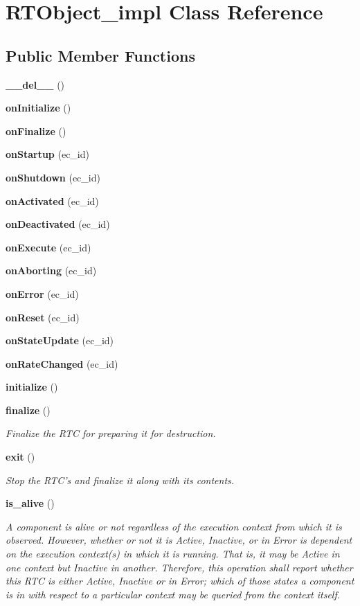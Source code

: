 \section{RTObject\_\-impl Class Reference}
\label{classRTObject__impl}
\subsection*{Public Member Functions}
\begin{CompactItemize}
\item 
{\bf \_\-\_\-del\_\-\_\-} ()
\item 
{\bf on\-Initialize} ()
\item 
{\bf on\-Finalize} ()
\item 
{\bf on\-Startup} (ec\_\-id)
\item 
{\bf on\-Shutdown} (ec\_\-id)
\item 
{\bf on\-Activated} (ec\_\-id)
\item 
{\bf on\-Deactivated} (ec\_\-id)
\item 
{\bf on\-Execute} (ec\_\-id)
\item 
{\bf on\-Aborting} (ec\_\-id)
\item 
{\bf on\-Error} (ec\_\-id)
\item 
{\bf on\-Reset} (ec\_\-id)
\item 
{\bf on\-State\-Update} (ec\_\-id)
\item 
{\bf on\-Rate\-Changed} (ec\_\-id)
\item 
{\bf initialize} ()
\item 
{\bf finalize} ()
\begin{CompactList}\small\item\em Finalize the RTC for preparing it for destruction. \item\end{CompactList}\item 
{\bf exit} ()
\begin{CompactList}\small\item\em Stop the RTC's and finalize it along with its contents. \item\end{CompactList}\item 
{\bf is\_\-alive} ()
\begin{CompactList}\small\item\em A component is alive or not regardless of the execution context from which it is observed. However, whether or not it is Active, Inactive, or in Error is dependent on the execution context(s) in which it is running. That is, it may be Active in one context but Inactive in another. Therefore, this operation shall report whether this RTC is either Active, Inactive or in Error; which of those states a component is in with respect to a particular context may be queried from the context itself. \item\end{CompactList}\item 

\end{CompactItemize}
